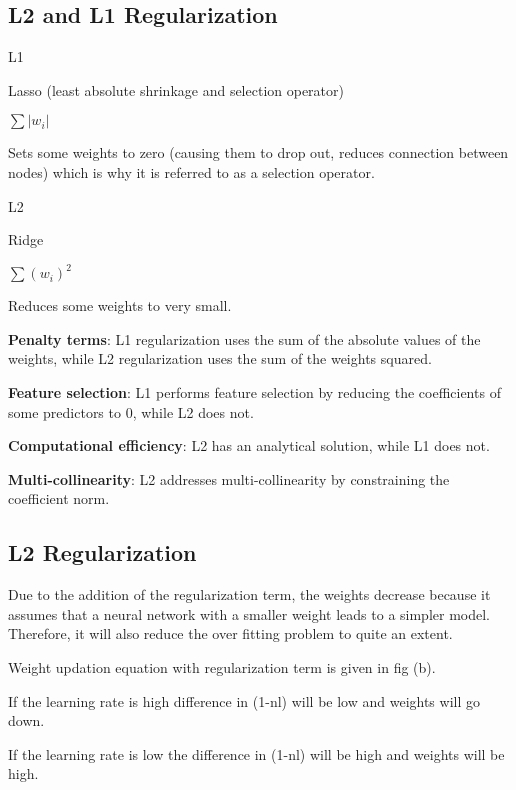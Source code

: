 	\subsection{L2 and L1 Regularization}
	\begin{plainlist}
		\item L1
		\begin{bulletedlist}
			\item Lasso (least absolute shrinkage and selection operator)
			\item $\sum \left| w_i \right|$
			\item Sets some weights to zero (causing them to drop out, reduces connection between nodes) which is why it is referred to as a selection operator.
		\end{bulletedlist}
		\item L2
		\begin{bulletedlist}
			\item Ridge
			\item $\sum \left( w_i \right)^2$
			\item Reduces some weights to very small.
		\end{bulletedlist}
	\end{plainlist}

	\vspace{\baselineskip}
	\begin{bulletedlist}
		\item {\bfseries Penalty terms}: L1 regularization uses the sum of the absolute values of the weights, while L2 regularization uses the sum of the weights squared.
		\item {\bfseries Feature selection}: L1 performs feature selection by reducing the coefficients of some predictors to 0, while L2 does not.
		\item {\bfseries Computational efficiency}: L2 has an analytical solution, while L1 does not.
		\item {\bfseries Multi-collinearity}: L2 addresses multi-collinearity by constraining the coefficient norm.
	\end{bulletedlist}

	\subsection{L2 Regularization}
	\begin{bulletedlist}
		\item Due to the addition of the regularization term, the weights decrease because it assumes that a neural network with a smaller weight leads to
a simpler model. Therefore, it will also reduce the over fitting problem to quite an extent.
		\item Weight updation equation with regularization term is given in fig (b).
		\item If the learning rate is high difference in (1-nl) will be low and weights will go down.
		\item If the learning rate is low the difference in (1-nl) will be high and weights will be high.
	\end{bulletedlist}

